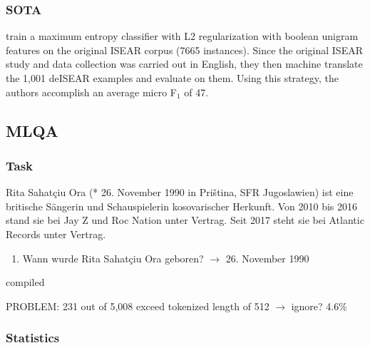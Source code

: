 



\subsubsection{SOTA}

\cite{troiano2019crowdsourcing} train a maximum entropy classifier with L2 regularization with
boolean unigram features on the original ISEAR corpus (7665 instances).
Since the original ISEAR study and data collection was carried out in English, they then machine
translate the 1,001 deISEAR examples and evaluate on them.
Using this strategy, the authors accomplish an average micro F$_1$ of 47.

\subsection{MLQA}

\subsubsection{Task}

\begin{examples}
  \label{ex:mlqa}
  \item Rita Sahatçiu Ora (* 26. November 1990 in Priština, SFR Jugoslawien) ist eine britische Sängerin und Schauspielerin kosovarischer Herkunft. Von 2010 bis 2016 stand sie bei Jay Z und Roc Nation unter Vertrag. Seit 2017 steht sie bei Atlantic Records unter Vertrag.
\end{examples}

\begin{enumerate}
  \item Wann wurde Rita Sahatçiu Ora geboren? $\rightarrow$ 26. November 1990
\end{enumerate}

\cite{lewis2019mlqa} compiled

PROBLEM: 231 out of 5,008 exceed tokenized length of 512 $\rightarrow$ ignore? 4.6\%

\subsubsection{Statistics}

